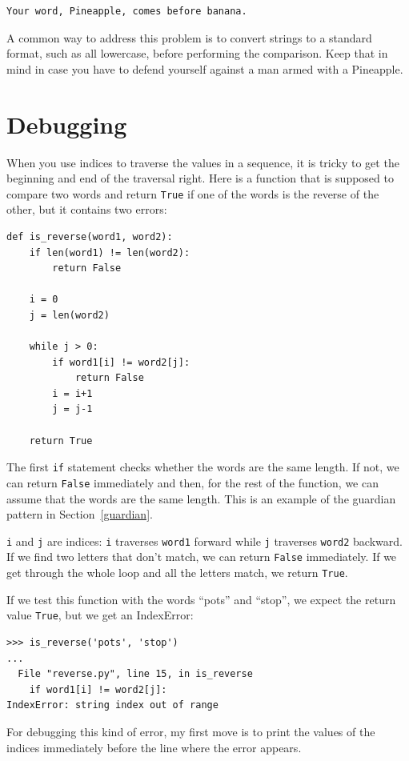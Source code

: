 \documentclass[10pt]{book}
\begin{document}
\beforeverb
\begin{verbatim}
Your word, Pineapple, comes before banana.
\end{verbatim}
\afterverb
%
A common way to address this problem is to convert strings to a
standard format, such as all lowercase, before performing the
comparison.  Keep that in mind in case you have to defend yourself
against a man armed with a Pineapple.


\section{Debugging}


When you use indices to traverse the values in a sequence,
it is tricky to get the beginning and end of the traversal
right.  Here is a function that is supposed to compare two
words and return {\tt True} if one of the words is the reverse
of the other, but it contains two errors:

\beforeverb
\begin{verbatim}
def is_reverse(word1, word2):
    if len(word1) != len(word2):
        return False
    
    i = 0
    j = len(word2)

    while j > 0:
        if word1[i] != word2[j]:
            return False
        i = i+1
        j = j-1

    return True
\end{verbatim}
\afterverb
%
The first {\tt if} statement checks whether the words are the
same length.  If not, we can return {\tt False} immediately
and then, for the rest of the function, we can assume that the words
are the same length.  This is an example of the guardian pattern
in Section~\ref{guardian}.


{\tt i} and {\tt j} are indices: {\tt i} traverses {\tt word1}
forward while {\tt j} traverses {\tt word2} backward.  If we find
two letters that don't match, we can return {\tt False} immediately.
If we get through the whole loop and all the letters match, we
return {\tt True}.

If we test this function with the words ``pots'' and ``stop'', we
expect the return value {\tt True}, but we get an IndexError:


\beforeverb
\begin{verbatim}
>>> is_reverse('pots', 'stop')
...
  File "reverse.py", line 15, in is_reverse
    if word1[i] != word2[j]:
IndexError: string index out of range
\end{verbatim}
\afterverb
%
For debugging this kind of error, my first move is to
print the values of the indices immediately before the line
where the error appears.
\end{document}
